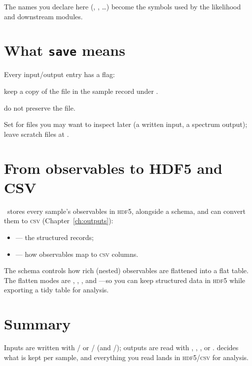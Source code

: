 \noindent The names you declare here (, , \ldots) become the
symbols used by the likelihood and downstream modules.

\section{What \texttt{save} means}
\label{sec:io-save}

Every input/output entry has a  flag:

\begin{description}[style=nextline, leftmargin=1.2em]
  \item[\yamlkey{save: true}] keep a copy of the file in the sample record under .
  \item[\yamlkey{save: false}] do not preserve the file.
\end{description}

\noindent Set  for files you may want to inspect later (a written input, a
spectrum output); leave scratch files at .

\section{From observables to HDF5 and CSV}
\label{sec:io-hdf5}

\Jarvis\ stores every sample's observables in \textsc{hdf5}, alongside a schema, and can convert
them to \textsc{csv} (Chapter~\ref{ch:outputs}):

\begin{itemize}
  \item {} --- the structured records;
  \item {} --- how observables map to \textsc{csv} columns.
\end{itemize}

\noindent The schema controls how rich (nested) observables are flattened into a flat table. The
flatten modes are , , , and ---so you
can keep structured data in \textsc{hdf5} while exporting a tidy table for analysis.

\section{Summary}
\label{sec:io-summary}

Inputs are written with / or / (and
/); outputs are read with , ,
, or .  decides what is kept per sample, and
everything you read lands in \textsc{hdf5}/\textsc{csv} for analysis.
